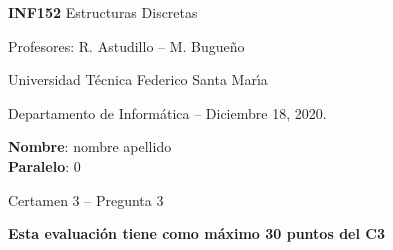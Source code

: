 \documentclass[letterpaper,10pt]{article}
\begin{document}
\thispagestyle{empty}

\begin{minipage}[t]{0.6\textwidth}

{\LARGE \textbf{INF152} Estructuras Discretas}

{\large Profesores: R. Astudillo -- M. Bugueño}

Universidad T\'ecnica Federico Santa Mar\'{\i}a

Departamento de Inform\'atica -- Diciembre 18, 2020.

\end{minipage}
\hfill
\begin{minipage}[t]{0.35\textwidth}
\textbf{Nombre}: nombre apellido\\[0.3cm]
  \textbf{Paralelo}: 0
\end{minipage}

\vspace{0.8cm}

{\Large Certamen 3 -- Pregunta 3}

\vspace{0.4cm}

\textbf{Esta evaluación tiene como máximo 30 puntos del C3}
\end{document}
